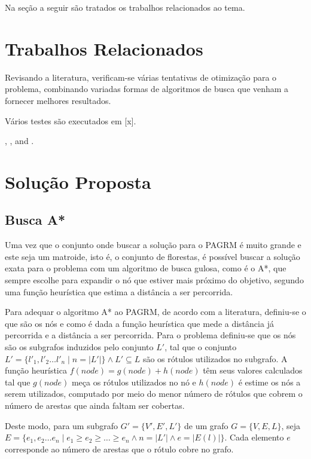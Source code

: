 \documentclass[12pt]{article}
\begin{document}
	Na seção a seguir são tratados os trabalhos relacionados ao tema.

\section{Trabalhos Relacionados}\label{sec:trabalhosRelacionados}

	Revisando a literatura, verificam-se várias tentativas de otimização para o problema, combinando variadas formas de algoritmos de busca que venham a fornecer melhores resultados.

	Vários testes são executados em [x].

	\cite{knuth:84}, \cite{boulic:91}, and \cite{smith:99}.

\section{Solução Proposta}\label{sec:solucao}

	\subsection{Busca A*}\label{sec:aestrela}

		Uma vez que o conjunto onde buscar a solução para o PAGRM é muito grande e este seja um matroide, isto é, o conjunto de florestas, é possível buscar a solução exata para o problema com um algoritmo de busca gulosa, como é o A*, que sempre escolhe para expandir o nó que estiver mais próximo do objetivo, segundo uma função heurística que estima a distância a ser percorrida.

		Para adequar o algoritmo A* ao PAGRM, de acordo com a literatura, definiu-se o que são os nós e como é dada a função heurística que mede a distância já percorrida e a distância a ser percorrida. Para o problema definiu-se que os nós são os subgrafos induzidos pelo conjunto $L'$, tal que o conjunto $L' = \{l'_1, l'_2 \dots l'_n \mid n = |L'|\} \wedge L' \subseteq L$ são os rótulos utilizados no subgrafo. A função heurística $f(node) = g(node) + h(node)$ têm seus valores calculados tal que $g(node)$ meça os rótulos utilizados no nó e $h(node)$ é estime os nós a serem utilizados, computado por meio do menor número de rótulos que cobrem o número de arestas que ainda faltam ser cobertas.

		Deste modo, para um subgrafo $G' = \{V', E', L'\}$ de um grafo $G = \{V, E, L\}$, seja $E = \{e_1, e_2 \dots e_n \mid e_1 \geq e_2 \geq \dots \geq e_n \wedge n = |L'| \wedge e = |E(l)|\}$. Cada elemento $e$ corresponde ao número de arestas que o rótulo cobre no grafo.
\end{document}
